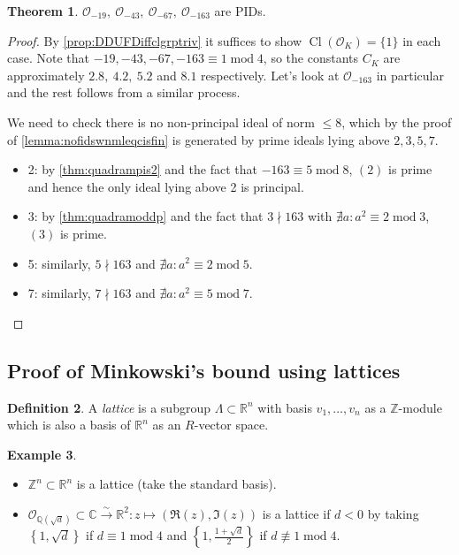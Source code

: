 \documentclass{article}
\newcommand{\Z}{\mathbb{Z}}
\newcommand{\Q}{\mathbb{Q}}
\newcommand{\R}{\mathbb{R}}
\newcommand{\C}{\mathbb{C}}
\newcommand{\Mod}{\operatorname{mod}}
\newcommand{\Cl}{\operatorname{Cl}}
\newcommand{\ri}{\mathcal{O}}
\theoremstyle{definition}
\newtheorem{defn}{Definition}[subsection]
\newtheorem{thm}[defn]{Theorem}
\newtheorem{example}[defn]{Example}
\begin{document}
\begin{thm}
$\ri_{-19},\ \ri_{-43},\ \ri_{-67},\ \ri_{-163}$ are PIDs.
\end{thm}
\begin{proof}
By \ref{prop:DDUFDiffclgrptriv} it suffices to show $\Cl(\ri_K)=\{1\}$ in each case. Note that $-19,-43,-67,-163\equiv 1\Mod 4$, so the constants $C_K$ are approximately $2.8,\ 4.2,\ 5.2$ and $8.1$ respectively. Let's look at $\ri_{-163}$ in particular and the rest follows from a similar process.

We need to check there is no non-principal ideal of norm $\leq 8$, which by the proof of \ref{lemma:nofidswnmleqcisfin} is generated by prime ideals lying above $2,3,5,7$.
\begin{itemize}
\item 2: by \ref{thm:quadrampis2} and the fact that $-163\equiv 5\Mod 8$, $(2)$ is prime and hence the only ideal lying above 2 is principal.
\item 3: by \ref{thm:quadramoddp} and the fact that $3\nmid 163$ with $\nexists a:a^2\equiv 2\Mod 3$, $(3)$ is prime.
\item 5: similarly, $5\nmid 163$ and $\nexists a:a^2\equiv 2\Mod 5$.
\item 7: similarly, $7\nmid 163$ and $\nexists a:a^2\equiv 5\Mod 7$.
\end{itemize}
\end{proof}

\subsection{Proof of Minkowski's bound using lattices}
\begin{defn}
A \textit{lattice} is a subgroup $\Lambda\subset\R^n$ with basis $v_1,\ldots,v_n$ as a $\Z$-module which is also a basis of $\R^n$ as an $R$-vector space.
\end{defn}
\begin{example}
\label{example:lattices}
\begin{itemize}
\item $\Z^n\subset\R^n$ is a lattice (take the standard basis).
\item $\ri_{\Q\left(\sqrt d\right)}\subset\C\xrightarrow{\sim}\R^2:z\mapsto(\Re(z),\Im(z))$ is a lattice if $d<0$ by taking $\left\{1,\sqrt d\right\}$ if $d\equiv 1\Mod 4$ and $\left\{1,\frac{1+\sqrt d}{2}\right\}$ if $d\nequiv 1\Mod 4$.
\end{itemize}
\end{example}
\end{document}
